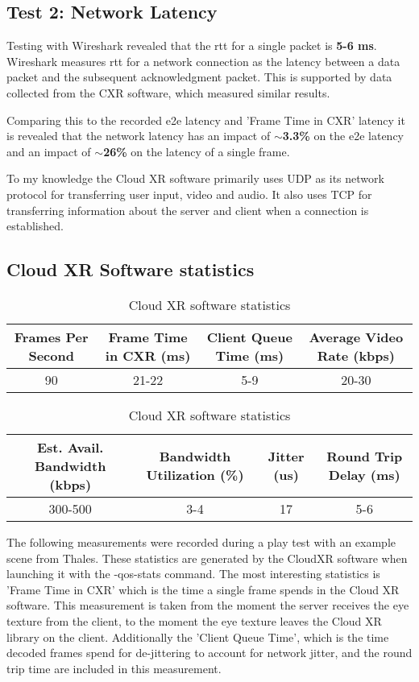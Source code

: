 \subsection{Test 2: Network Latency}
\label{sec:res:t2}
Testing with Wireshark \parencite{wireshark} revealed that the \acrfull{rtt} for a single packet is \textbf{5-6 ms}. Wireshark measures \acrshort{rtt} for a network connection as the latency between a data packet and the subsequent acknowledgment packet. This is supported by data collected from the CXR \parencite{cloudxr} software, which measured similar results. 

Comparing this to the recorded \acrshort{e2e} latency and 'Frame Time in CXR' latency it is revealed that the network latency has an impact of \textbf{$\sim$3.3\%} on the \acrshort{e2e} latency and an impact of \textbf{$\sim$26\%} on the latency of a single frame.

To my knowledge the Cloud XR software primarily uses UDP as its network protocol for transferring user input, video and audio. It also uses TCP for transferring information about the server and client when a connection is established.

\subsection{Cloud XR Software statistics}
\label{sec:res:t3}
\begin{table}[h!]
\begin{center}
\caption{Cloud XR software statistics}
\begin{tabular}{|c|c|c|c|}
\hline
Frames Per Second & Frame Time in CXR (\acrshort{ms}) & Client Queue Time (\acrshort{ms}) & Average Video Rate (kbps)  \\ \hline
90 & 21-22 & 5-9 & 20-30 \\ \hline
\end{tabular}
\begin{tabular}{|c|c|c|c|}
\hline
Est. Avail. Bandwidth (kbps) & Bandwidth Utilization (\%) & Jitter (\acrshort{us}) & Round Trip Delay (\acrshort{ms}) \\ \hline
300-500 & 3-4 & 17 & 5-6 \\ \hline
\end{tabular}
\end{center}
\end{table}

The following measurements were recorded during a play test with an example scene from Thales. These statistics are generated by the CloudXR software when launching it with the -qos-stats command. The most interesting statistics is 'Frame Time in CXR' which is the time a single frame spends in the Cloud XR software. This measurement is taken from the moment the server receives the eye texture from the client, to the moment the eye texture leaves the Cloud XR library on the client. Additionally the 'Client Queue Time', which is the time decoded frames spend for de-jittering to account for network jitter, and the round trip time are included in this measurement.